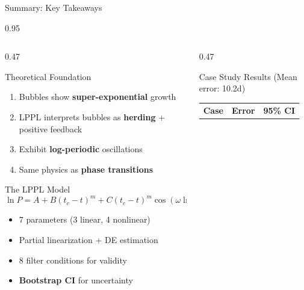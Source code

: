 \documentclass[9pt, aspectratio=169, t]{beamer}
\begin{document}
\begin{frame}{Summary: Key Takeaways}
    \begin{cminipage}{0.95\textwidth}
    {\scriptsize
    \begin{columns}[T]
        \begin{column}{0.47\textwidth}
            \begin{block}{Theoretical Foundation}
                \begin{enumerate}\setlength{\itemsep}{0pt}
                    \item Bubbles show \textbf{super-exponential} growth
                    \item LPPL interprets bubbles as \textbf{herding} + positive feedback
                    \item Exhibit \textbf{log-periodic} oscillations
                    \item Same physics as \textbf{phase transitions}
                \end{enumerate}
            \end{block}
            \vspace{-3mm}
            \begin{exampleblock}{The LPPL Model}
                $$\ln P = A + B(t_c-t)^m + C(t_c-t)^m\cos(\omega\ln(t_c-t)-\phi)$$
                \begin{itemize}\setlength{\itemsep}{0pt}
                    \item 7 parameters (3 linear, 4 nonlinear)
                    \item Partial linearization + DE estimation
                    \item 8 filter conditions for validity
                    \item \textbf{Bootstrap CI} for uncertainty
                \end{itemize}
            \end{exampleblock}
        \end{column}
        \begin{column}{0.47\textwidth}
            \begin{exampleblock}{Case Study Results (Mean error: 10.2d)}
                {\scriptsize
                \vspace{-1mm}
                \begin{center}
                    \begin{tabular}{lcc}
                        \toprule
                        \textbf{Case} & \textbf{Error} & \textbf{95\% CI} \\

\end{tabular}
\end{center}}
\end{exampleblock}
\end{column}
\end{columns}}
\end{cminipage}
\end{frame}
\end{document}
